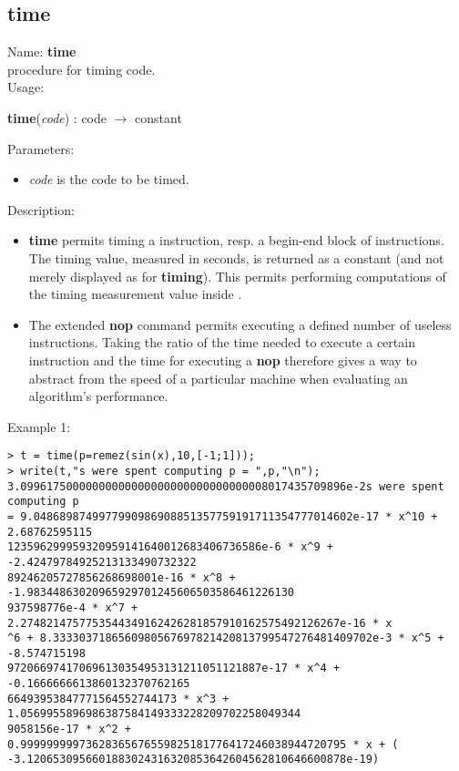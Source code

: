 \subsection{time}
\label{labtime}
\noindent Name: \textbf{time}\\
\phantom{aaa}procedure for timing \sollya code.\\[0.2cm]
\noindent Usage: 
\begin{center}
\textbf{time}(\emph{code}) : \textsf{code} $\rightarrow$ \textsf{constant}\\
\end{center}
Parameters: 
\begin{itemize}
\item \emph{code} is the code to be timed.
\end{itemize}
\noindent Description: \begin{itemize}

\item \textbf{time} permits timing a \sollya instruction, resp. a begin-end block
   of \sollya instructions. The timing value, measured in seconds, is returned
   as a \sollya constant (and not merely displayed as for \textbf{timing}). This 
   permits performing computations of the timing measurement value inside \sollya.

\item The extended \textbf{nop} command permits executing a defined number of
   useless instructions. Taking the ratio of the time needed to execute a
   certain \sollya instruction and the time for executing a \textbf{nop}
   therefore gives a way to abstract from the speed of a particular 
   machine when evaluating an algorithm's performance.
\end{itemize}
\noindent Example 1: 
\begin{center}\begin{minipage}{15cm}\begin{Verbatim}[frame=single]
> t = time(p=remez(sin(x),10,[-1;1]));
> write(t,"s were spent computing p = ",p,"\n");
3.09961750000000000000000000000000000008017435709896e-2s were spent computing p 
= 9.0486898749977990986908851357759191711354777014602e-17 * x^10 + 2.68762595115
123596299959320959141640012683406736586e-6 * x^9 + -2.42479784925213133490732322
89246205727856268698001e-16 * x^8 + -1.98344863020965929701245606503586461226130
937598776e-4 * x^7 + 2.2748214757753544349162426281857910162575492126267e-16 * x
^6 + 8.3333037186560980567697821420813799547276481409702e-3 * x^5 + -8.574715198
972066974170696130354953131211051121887e-17 * x^4 + -0.1666666613860132370762165
66493953847771564552744173 * x^3 + 1.0569955896986387584149333228209702258049344
9058156e-17 * x^2 + 0.99999999973628365676559825181776417246038944720795 * x + (
-3.1206530956601883024316320853642604562810646600878e-19)
\end{Verbatim}
\end{minipage}\end{center}
